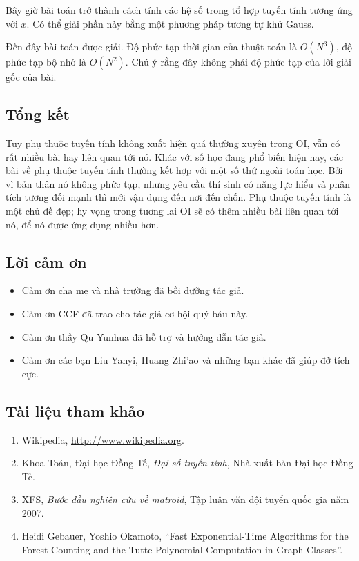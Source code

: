 \documentclass[11pt]{article}
\begin{document}
Bây giờ bài toán trở thành cách tính các hệ số trong tổ hợp tuyến tính tương ứng
với \(x\). Có thể giải phần này bằng một phương pháp tương tự khử Gauss.

Đến đây bài toán được giải. Độ phức tạp thời gian của thuật toán là \(O(N^3)\),
độ phức tạp bộ nhớ là \(O(N^2)\). Chú ý rằng đây không phải độ phức tạp của lời
giải gốc của bài.

\subsection{Tổng kết}

Tuy phụ thuộc tuyến tính không xuất hiện quá thường xuyên trong OI, vẫn có rất
nhiều bài hay liên quan tới nó. Khác với số học đang phổ biến hiện nay, các bài
về phụ thuộc tuyến tính thường kết hợp với một số thứ ngoài toán học. Bởi vì
bản thân nó không phức tạp, nhưng yêu cầu thí sinh có năng lực hiểu và phân tích
tương đối mạnh thì mới vận dụng đến nơi đến chốn. Phụ thuộc tuyến tính là một
chủ đề đẹp; hy vọng trong tương lai OI sẽ có thêm nhiều bài liên quan tới nó, để
nó được ứng dụng nhiều hơn.

\subsection{Lời cảm ơn}

\begin{itemize}
  \item Cảm ơn cha mẹ và nhà trường đã bồi dưỡng tác giả.
  \item Cảm ơn CCF đã trao cho tác giả cơ hội quý báu này.
  \item Cảm ơn thầy Qu Yunhua đã hỗ trợ và hướng dẫn tác giả.
  \item Cảm ơn các bạn Liu Yanyi, Huang Zhi'ao và những bạn khác đã giúp đỡ
  tích cực.
\end{itemize}

\subsection*{Tài liệu tham khảo}

\begin{enumerate}
  \item Wikipedia, \url{http://www.wikipedia.org}.
  \item Khoa Toán, Đại học Đồng Tế, \emph{Đại số tuyến tính}, Nhà xuất bản Đại
  học Đồng Tế.
  \item XFS, \emph{Bước đầu nghiên cứu về matroid}, Tập luận văn đội tuyển quốc
  gia năm 2007.
  \item Heidi Gebauer, Yoshio Okamoto, ``Fast Exponential-Time Algorithms for the
  Forest Counting and the Tutte Polynomial Computation in Graph Classes''.
\end{enumerate}
\end{document}
